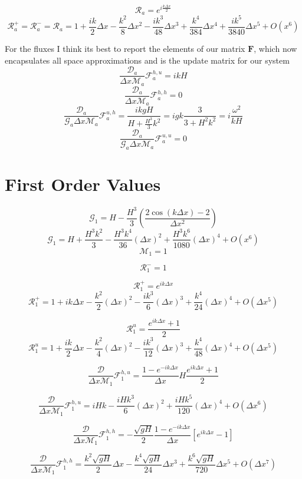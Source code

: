 \documentclass[12pt]{article}
\begin{document}
\[\mathcal{R}_a = e^{i \frac{k\Delta x}{2}}\]
\[\mathcal{R}_a^+ = \mathcal{R}_a^-=\mathcal{R}_a = 1 + \frac{ik}{2}\Delta x   - \frac{k^2}{8}\Delta x^2 - \frac{ik^3}{48}\Delta x^3 + \frac{k^4}{384}\Delta x^4 + \frac{ik^5}{3840}\Delta x^5 + O(x^{6})\]


For the fluxes I think its best to report the elements of our matrix $\boldsymbol{F}$, which now encapsulates all space approximations and is the update matrix for our system
\[\frac{\mathcal{D}_a}{\Delta x\mathcal{M}_a}\mathcal{F}^{h,u}_a = ikH\]
\[\frac{\mathcal{D}_a}{\Delta x\mathcal{M}_a}\mathcal{F}^{h,h}_a = 0\]
\[\frac{\mathcal{D}_a}{\mathcal{G}_a\Delta x\mathcal{M}_a}\mathcal{F}^{u,h}_a = \frac{ikgH}{H + \frac{H^3}{3}k^2} = igk\frac{3}{3 + H^2k^2} = i\frac{\omega^2}{kH} \]
\[\frac{\mathcal{D}_a}{\mathcal{G}_a\Delta x\mathcal{M}_a}\mathcal{F}^{u,u}_a = 0\]


\section{First Order Values }
\[\mathcal{G}_1 = H - \frac{H^3}{3}\left(\frac{ 2\cos\left(k\Delta x\right) - 2 }{\Delta x^2}\right)\]
\[\mathcal{G}_1 = H +\frac{H^3 k^2}{3}  -\frac{H^3 k^4}{36}(\Delta x)^2 + \frac{H^3 k^6}{1080}(\Delta x)^4 + O(x^{6})\]
\[\mathcal{M}_1 = 1\]

\[\mathcal{R}^-_1 =  1\]

\[\mathcal{R}^+_1 = e^{ik\Delta x}\]
\[\mathcal{R}^+_1 = 1 + i k\Delta x  - \frac{k^2}{2} (\Delta x)^2 - \frac{ik^3}{6} (\Delta x)^3 + \frac{k^4}{24} (\Delta x)^4 +  O(\Delta x^5)\]

\[\mathcal{R}^u_1 = \frac{e^{ik\Delta x } + 1}{2} \]
\[\mathcal{R}^u_1 = 1 + \frac{ik}{2}\Delta x - \frac{k^2}{4} (\Delta x)^2 - \frac{i k^3}{12} ( \Delta x)^3 + \frac{k^4}{48} ( \Delta x)^4+  O( \Delta x^5)\]


\[\frac{\mathcal{D}}{\Delta x\mathcal{M}_1}\mathcal{F}^{h,u}_1 = \frac{1 -e^{-ik\Delta x}}{\Delta x} H \frac{e^{ik\Delta x } + 1}{2}\]

\[\frac{\mathcal{D}}{\Delta x\mathcal{M}_1}\mathcal{F}^{h,u}_1 = iHk  - \frac{iHk^3}{6}( \Delta x)^2 + \frac{iHk^5}{120}( \Delta x)^4 +  O( \Delta x^6)\]

\[\frac{\mathcal{D}}{\Delta x\mathcal{M}_1}\mathcal{F}^{h,h}_1 = -\dfrac{ \sqrt{gH}}{ 2} \frac{1 -e^{-ik\Delta x}}{\Delta x} \left [ e^{ik\Delta x}- 1 \right ]\]

\[\frac{\mathcal{D}}{\Delta x\mathcal{M}_1}\mathcal{F}^{h,h}_1 = \frac{k^2\sqrt{gH} }{ 2}  \Delta x - \frac{k^4\sqrt{gH}}{ 24}  \Delta x^3 + \frac{k^6\sqrt{gH}}{ 720}  \Delta x^5 + O( \Delta x^7) \]
\end{document}
